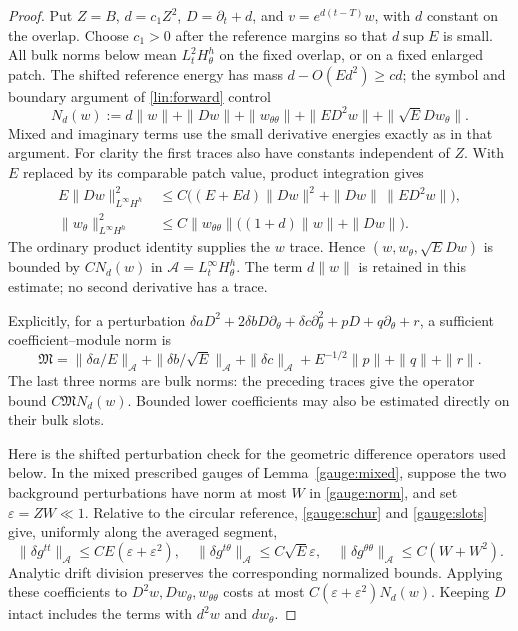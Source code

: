 \begin{proof}
Put $Z=B$, $d=c_1Z^2$, $D=\partial_t+d$, and
$v=e^{d(t-T)}w$, with $d$ constant on the overlap.
Choose $c_1>0$ after the reference margins so that $d\sup E$ is
small.  All bulk norms below mean $L^2_tH^h_\theta$ on the fixed
overlap, or on a fixed enlarged patch.  The shifted reference energy
has mass $d-O(Ed^2)\ge cd$; the symbol and boundary argument of
\eqref{lin:forward} control
\[
 N_d(w):=d\|w\|+\|Dw\|+\|w_{\theta\theta}\|
           +\|ED^2w\|+\|\sqrt E D w_\theta\|.
\]
Mixed and imaginary terms use the small derivative energies exactly
as in that argument.  For clarity the first traces also have constants
independent of $Z$.  With $E$ replaced by its comparable patch value,
product integration gives
\begin{align*}
 E\|Dw\|_{L^\infty H^h}^2
 &\le C\bigl((E+Ed)\|Dw\|^2+\|Dw\|\,\|ED^2w\|\bigr),\\
 \|w_\theta\|_{L^\infty H^h}^2
 &\le C\|w_{\theta\theta}\|
                   \bigl((1+d)\|w\|+\|Dw\|\bigr).
\end{align*}
The ordinary product identity supplies the $w$ trace.  Hence
$(w,w_\theta,\sqrt E Dw)$ is bounded by $CN_d(w)$ in
$\mathcal A=L^\infty_tH^h_\theta$.  The term $d\|w\|$ is
retained in this estimate; no second derivative has a trace.

Explicitly, for a perturbation
$\delta aD^2+2\delta bD\partial_\theta+\delta c\partial_\theta^2
+pD+q\partial_\theta+r$, a sufficient coefficient--module norm is
\[
 \mathfrak M=\|\delta a/E\|_{\mathcal A}
 +\|\delta b/\sqrt E\|_{\mathcal A}+\|\delta c\|_{\mathcal A}
 +E^{-1/2}\|p\|+\|q\|+\|r\|.
\]
The last three norms are bulk norms: the preceding traces give the
operator bound $C\mathfrak M N_d(w)$.  Bounded lower coefficients
may also be estimated directly on their bulk slots.

Here is the shifted perturbation check for the geometric difference
operators used below.  In the mixed prescribed gauges of
Lemma~\ref{gauge:mixed}, suppose the two background perturbations
have norm at most $W$ in \eqref{gauge:norm}, and set
$\varepsilon=ZW\ll1$.  Relative to the circular reference,
\eqref{gauge:schur} and \eqref{gauge:slots} give, uniformly along
the averaged segment,
\[
 \|\delta g^{tt}\|_{\mathcal A}\le CE(\varepsilon+\varepsilon^2),
 \quad\|\delta g^{t\theta}\|_{\mathcal A}\le C\sqrt E\varepsilon,
 \quad\|\delta g^{\theta\theta}\|_{\mathcal A}\le C(W+W^2).
\]
Analytic drift division preserves the corresponding normalized bounds.
Applying these coefficients to $D^2w,Dw_\theta,w_{\theta\theta}$
costs at most $C(\varepsilon+\varepsilon^2)N_d(w)$.
Keeping $D$ intact includes the terms with $d^2w$ and $dw_\theta$.


\end{proof}
